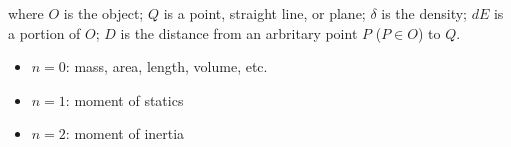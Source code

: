 where $O$ is the object; $Q$ is a point, straight line, or plane; $\delta$ is the density; $dE$ is a portion of $O$; $D$ is the distance from an arbritary point $P$ ($P \in O$) to $Q$.
\begin{itemize}
    \item $n = 0$: mass, area, length, volume, etc.
    \item $n = 1$: moment of statics
    \item $n = 2$: moment of inertia
\end{itemize}
\endgroup